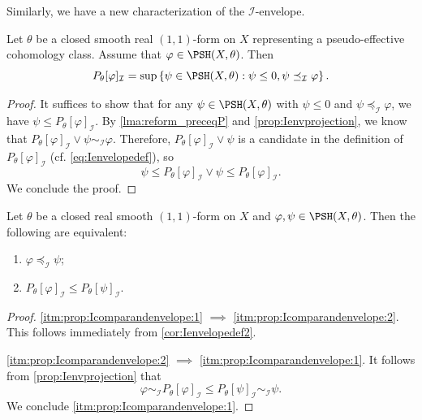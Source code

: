 Similarly, we have a new characterization of the $\mathcal{I}$-envelope.
\begin{corollary}\label{cor:Ienvelopedef2}
    Let $\theta$ be a closed smooth real $(1,1)$-form on $X$ representing a pseudo-effective cohomology class.
    Assume that $\varphi\in \PSH(X,\theta)$. Then
    \[
        P_{\theta}[\varphi]_{\mathcal{I}}=\sup\left\{ \psi\in \PSH(X,\theta): \psi\leq 0, \psi\preceq_{\mathcal{I}} \varphi \right\}.
    \]
\end{corollary}
\begin{proof}
    It suffices to show that for any $\psi\in \PSH(X,\theta)$ with $\psi\leq 0$ and $\psi\preceq_{\mathcal{I}}\varphi$, we have $\psi\leq P_{\theta}[\varphi]_{\mathcal{I}}$.
    By \cref{lma:reform_preceqP} and \cref{prop:Ienvprojection}, we know that $P_{\theta}[\varphi]_{\mathcal{I}}\lor \psi\sim_{\mathcal{I}}\varphi$. Therefore, $P_{\theta}[\varphi]_{\mathcal{I}}\lor \psi$ is a candidate in the definition of $P_{\theta}[\varphi]_{\mathcal{I}}$ (cf. \eqref{eq:Ienvelopedef}), so
    \[
    \psi\leq P_{\theta}[\varphi]_{\mathcal{I}}\lor \psi\leq P_{\theta}[\varphi]_{\mathcal{I}}.
    \]
    We conclude the proof.
\end{proof}

\begin{proposition}\label{prop:Icomparandenvelope}
    Let $\theta$ be a closed real smooth $(1,1)$-form on $X$ and $\varphi,\psi\in \PSH(X,\theta)$. Then the following are equivalent:
    \begin{enumerate}
        \item\label{itm:prop:Icomparandenvelope:1} $\varphi\preceq_{\mathcal{I}}\psi$;
        \item\label{itm:prop:Icomparandenvelope:2} $P_{\theta}[\varphi]_{\mathcal{I}}\leq P_{\theta}[\psi]_{\mathcal{I}}$.
    \end{enumerate}
\end{proposition}
\begin{proof}
    \ref{itm:prop:Icomparandenvelope:1} $\implies$ \ref{itm:prop:Icomparandenvelope:2}. This follows immediately from \cref{cor:Ienvelopedef2}.

    \ref{itm:prop:Icomparandenvelope:2} $\implies$ \ref{itm:prop:Icomparandenvelope:1}. It follows from \cref{prop:Ienvprojection} that
    \[
        \varphi\sim_{\mathcal{I}} P_{\theta}[\varphi]_{\mathcal{I}}\leq P_{\theta}[\psi]_{\mathcal{I}} \sim_{\mathcal{I}} \psi.
    \]
    We conclude \ref{itm:prop:Icomparandenvelope:1}.
\end{proof}

